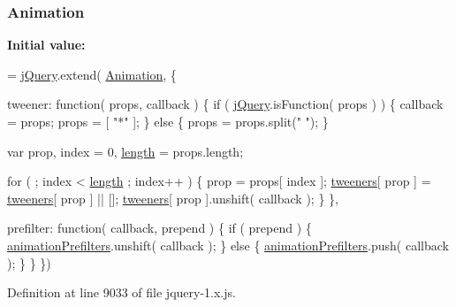 \subsubsection[{\texorpdfstring{Animation}{Animation}}]{ Animation}\hypertarget{jquery-1_8x_8js_a3299b781c8ec8287357326920ab3565a}{}\label{jquery-1_8x_8js_a3299b781c8ec8287357326920ab3565a}
{\bfseries Initial value\+:}
\begin{DoxyCode}
= \hyperlink{jquery-1_8x_8js_a2b1d6f9c448e3ce72f4e1865d6e38d2c}{jQuery}.extend( \hyperlink{jquery-1_8x_8js_a3299b781c8ec8287357326920ab3565a}{Animation}, \{

    tweener: \textcolor{keyword}{function}( props, callback ) \{
        \textcolor{keywordflow}{if} ( \hyperlink{jquery-1_8x_8js_a2b1d6f9c448e3ce72f4e1865d6e38d2c}{jQuery}.isFunction( props ) ) \{
            callback = props;
            props = [ \textcolor{stringliteral}{"*"} ];
        \} \textcolor{keywordflow}{else} \{
            props = props.split(\textcolor{stringliteral}{" "});
        \}

        var prop,
            index = 0,
            \hyperlink{xpresseditor_8min_8js_a8251a40bc2803d85bf8a918f1f288cce}{length} = props.length;

        \textcolor{keywordflow}{for} ( ; index < \hyperlink{xpresseditor_8min_8js_a8251a40bc2803d85bf8a918f1f288cce}{length} ; index++ ) \{
            prop = props[ index ];
            \hyperlink{jquery-1_8x_8js_a948afd2431eec272c99689edddfb6850}{tweeners}[ prop ] = \hyperlink{jquery-1_8x_8js_a948afd2431eec272c99689edddfb6850}{tweeners}[ prop ] || [];
            \hyperlink{jquery-1_8x_8js_a948afd2431eec272c99689edddfb6850}{tweeners}[ prop ].unshift( callback );
        \}
    \},

    prefilter: \textcolor{keyword}{function}( callback, prepend ) \{
        \textcolor{keywordflow}{if} ( prepend ) \{
            \hyperlink{jquery-1_8x_8js_adb3f17c5359fbc12b7043b6969553d78}{animationPrefilters}.unshift( callback );
        \} \textcolor{keywordflow}{else} \{
            \hyperlink{jquery-1_8x_8js_adb3f17c5359fbc12b7043b6969553d78}{animationPrefilters}.push( callback );
        \}
    \}
\})
\end{DoxyCode}


Definition at line 9033 of file jquery-\/1.\+x.\+js.

